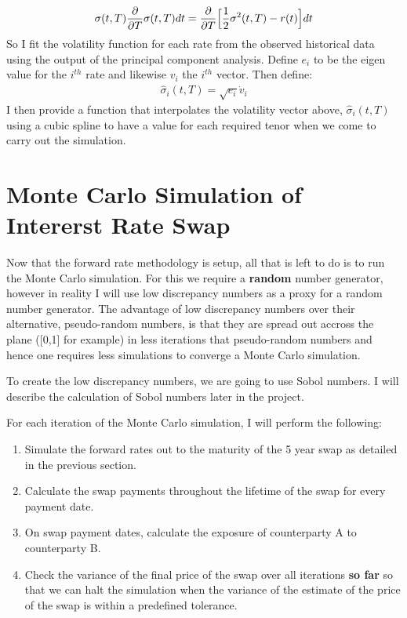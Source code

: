 \documentclass{report}
\theoremstyle{plain}
\theoremstyle{definition}
\begin{document}
\begin{align*}
	 \sigma(t,T)\frac{\partial}{\partial T}\sigma(t,T)dt = \frac{\partial}{\partial T}\Big{[}\frac{1}{2}\sigma^2(t,T) - r(t) \Big{]} dt
\end{align*}
So I fit the volatility function for each rate from the observed historical data using the output of the principal component analysis. Define $e_i$ to be the eigen value for the $i^{th}$ rate and likewise $v_i$ the $i^{th}$ vector. Then define:
\begin{align*}
	\hat{\sigma}_i(t,T) = \sqrt{e_i} \dot v_i
\end{align*}
I then provide a function that interpolates the volatility vector above, $\hat{\sigma}_i(t,T) $ using a cubic spline to have a value for each required tenor when we come to carry out the simulation.

\chapter{Monte Carlo Simulation of Intererst Rate Swap}

Now that the forward rate methodology is setup, all that is left to do is to run the Monte Carlo simulation. For this we require a \textbf{random} number generator, however in reality I will use low discrepancy numbers as a proxy for a random number generator. The advantage of low discrepancy numbers over their alternative, pseudo-random numbers, is that they are spread out accross the plane ([0,1] for example) in less iterations that pseudo-random numbers and hence one requires less simulations to converge a Monte Carlo simulation.

To create the low discrepancy numbers, we are going to use Sobol numbers. I will describe the calculation of Sobol numbers later in the project. 

For each iteration of the Monte Carlo simulation, I will perform the following: 

\begin{enumerate}
	\item Simulate the forward rates out to the maturity of the 5 year swap as detailed in the previous section.

	\item Calculate the swap payments throughout the lifetime of the swap for every payment date.

	\item On swap payment dates, calculate the exposure of counterparty A to counterparty B.

	\item Check the variance of the final price of the swap over all iterations \textbf{so far} so that we can halt the simulation when the variance of the estimate of the price of the swap is within a predefined tolerance.

\end{enumerate}
\end{document}
